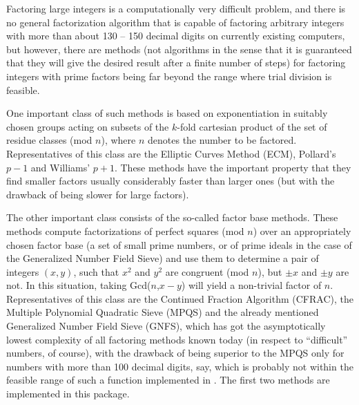 

Factoring large integers is a computationally very difficult problem,
and there is no general factorization algorithm that is capable of
factoring arbitrary integers with more than about 130 -- 150 decimal
digits on currently existing computers, but however, there are
methods (not algorithms in the sense that it is guaranteed that
they will give the desired result after a finite number of steps) for 
factoring integers with prime factors being far beyond the range where
trial division is feasible.

One important class of such methods is based on exponentiation in
suitably chosen groups acting on subsets of the $k$-fold cartesian
product of the set of residue classes (mod $n$), where $n$ denotes the
number to be factored.
Representatives of this class are the Elliptic Curves Method (ECM),
Pollard's $p-1$ and Williams' $p+1$.
These methods have the important property that they find smaller
factors usually considerably faster than larger ones
(but with the drawback of being slower for large factors).

The other important class consists of the so-called factor base methods.
These methods compute factorizations of perfect squares (mod $n$) over
an appropriately chosen factor base (a set of small prime numbers, or
of 
prime ideals in the case of the 
Generalized Number Field Sieve)
and use them to determine a pair of integers $(x,y)$, such that
$x^2$ and $y^2$ are congruent (mod $n$), but $\pm x$ and $\pm y$ are not.
In this situation, taking Gcd($n$,$x-y$) will yield a non-trivial
factor of $n$.
Representatives of this class are the Continued Fraction Algorithm 
(CFRAC), the Multiple Polynomial Quadratic Sieve (MPQS) and the
already mentioned Generalized Number Field Sieve (GNFS), which has got
the asymptotically lowest complexity of all factoring methods known today
(in respect to ``difficult'' numbers, of course), with the drawback
of being superior to the MPQS only for numbers with more than 100
decimal digits, say, which is probably not within the feasible range
of such a function implemented in {\GAP}.
The first two methods are implemented in this package.

